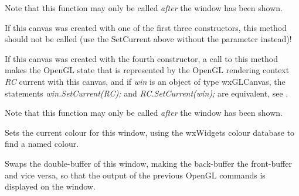 Note that this function may only be called \emph{after} the window has been shown.


\label{wxglcanvassetcurrentrc}


If this canvas was created with one of the first three constructors,
this method should not be called (use the SetCurrent above without the parameter instead)!

If this canvas was created with the fourth constructor, a call to this method
makes the OpenGL state that is represented by the OpenGL rendering context { \it RC } current with this canvas,
and if { \it win } is an object of type wxGLCanvas, the statements { \it win.SetCurrent(RC); } and { \it RC.SetCurrent(win); } are equivalent,
see .

Note that this function may only be called \emph{after} the window has been shown.


\label{wxglcanvassetcolour}


Sets the current colour for this window, using the wxWidgets colour database to find a named colour.


\label{wxglcanvasswapbuffers}


Swaps the double-buffer of this window, making the back-buffer the front-buffer and vice versa,
so that the output of the previous OpenGL commands is displayed on the window.


